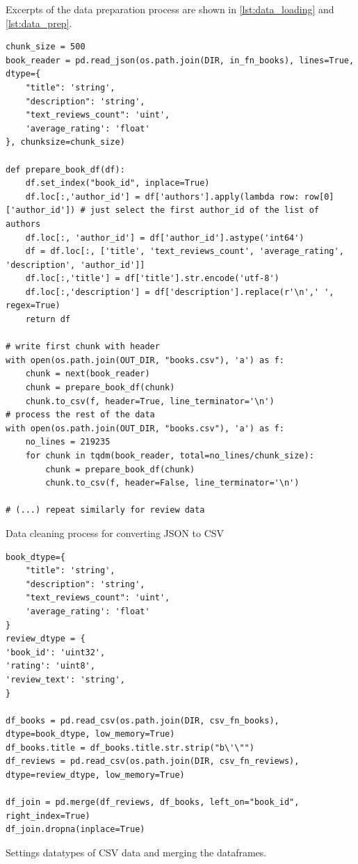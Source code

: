 \documentclass[10pt,final,journal,a4paper,oneside,twocolumn]{IEEEtran}
\begin{document}
Excerpts of the data preparation process are shown in \autoref{lst:data_loading} and \autoref{lst:data_prep}.

\begin{listing}[h]
    \begin{verbatim}
chunk_size = 500
book_reader = pd.read_json(os.path.join(DIR, in_fn_books), lines=True, dtype={
    "title": 'string', 
    "description": 'string', 
    "text_reviews_count": 'uint', 
    'average_rating': 'float'
}, chunksize=chunk_size)

def prepare_book_df(df):
    df.set_index("book_id", inplace=True)
    df.loc[:,'author_id'] = df['authors'].apply(lambda row: row[0]['author_id']) # just select the first author_id of the list of authors
    df.loc[:, 'author_id'] = df['author_id'].astype('int64')
    df = df.loc[:, ['title', 'text_reviews_count', 'average_rating', 'description', 'author_id']]
    df.loc[:,'title'] = df['title'].str.encode('utf-8')
    df.loc[:,'description'] = df['description'].replace(r'\n',' ', regex=True) 
    return df

# write first chunk with header
with open(os.path.join(OUT_DIR, "books.csv"), 'a') as f:
    chunk = next(book_reader)
    chunk = prepare_book_df(chunk)
    chunk.to_csv(f, header=True, line_terminator='\n')  
# process the rest of the data
with open(os.path.join(OUT_DIR, "books.csv"), 'a') as f:
    no_lines = 219235
    for chunk in tqdm(book_reader, total=no_lines/chunk_size):
        chunk = prepare_book_df(chunk)
        chunk.to_csv(f, header=False, line_terminator='\n')

# (...) repeat similarly for review data
    \end{verbatim}
\caption{Data cleaning process for converting JSON to CSV}
\label{lst:data_loading}
\end{listing}
\begin{listing}[h]
    \begin{verbatim}
book_dtype={
    "title": 'string', 
    "description": 'string', 
    "text_reviews_count": 'uint', 
    'average_rating': 'float'
}
review_dtype = {
'book_id': 'uint32',
'rating': 'uint8',
'review_text': 'string',
}

df_books = pd.read_csv(os.path.join(DIR, csv_fn_books), dtype=book_dtype, low_memory=True)
df_books.title = df_books.title.str.strip("b\'\"") 
df_reviews = pd.read_csv(os.path.join(DIR, csv_fn_reviews), dtype=review_dtype, low_memory=True)

df_join = pd.merge(df_reviews, df_books, left_on="book_id", right_index=True)
df_join.dropna(inplace=True)
    \end{verbatim}
\caption{Settings datatypes of CSV data and merging the dataframes.}
\label{lst:data_prep}
\end{listing}
\end{document}
